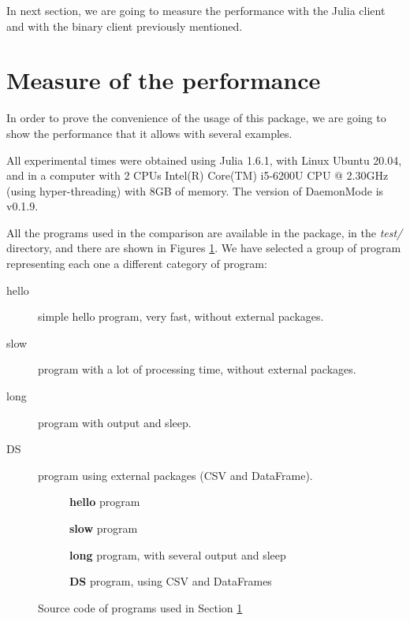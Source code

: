 \documentclass{juliacon}
\begin{document}
In next section, we are going to measure the performance with the Julia client
and with the binary client previously mentioned.

\section{Measure of the performance}
\label{sec:performance}

In order to prove the convenience of the usage of this package, we are going to
show the performance that it allows with several examples.

All experimental times  were obtained using Julia 1.6.1, with Linux Ubuntu
20.04, and in a computer with 2 CPUs Intel(R) Core(TM) i5-6200U CPU @ 2.30GHz
(using hyper-threading) with 8GB of memory. The version of DaemonMode is v0.1.9.

All the programs used in the comparison are available in the package, in the
\textit{test/} directory, and there are shown in Figures
\ref{fig:source_code}. We have selected a group of program representing each one
a different category of program:

\begin{description}
\item[hello] simple hello program, very fast, without external packages. 
\item[slow] program with a lot of processing time, without external packages.
\item[long] program with output and sleep.
\item[DS] program using external packages (CSV and DataFrame).

\end{description}

\begin{figure}[htp]
  \centering
  \begin{subfigure}[a]{\linewidth}
    
    \caption{\textbf{hello} program}
  \end{subfigure}
  \begin{subfigure}[b]{\linewidth}
    
    \caption{\textbf{slow} program}
  \end{subfigure}
  \begin{subfigure}[c]{\linewidth}
    
    \caption{\textbf{long} program, with several output and sleep}
  \end{subfigure}
  \begin{subfigure}[d]{\linewidth}
    
    \caption{\textbf{DS} program, using CSV and DataFrames\vspace{1em}}
  \end{subfigure}
  \caption{Source code of programs used in Section \ref{sec:performance}}
  \label{fig:source_code}
\end{figure}
\end{document}
